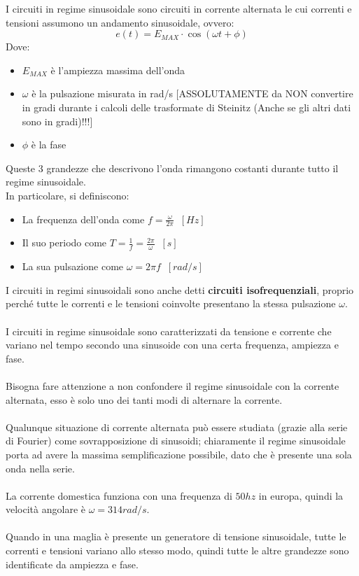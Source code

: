 \documentclass[../main.tex]{subfiles}
\begin{document}
	I circuiti in regime sinusoidale sono circuiti in corrente alternata le cui correnti e tensioni assumono un andamento sinusoidale, ovvero:
	\[e(t) = E_{MAX} \cdot \cos (\omega t + \phi)\]
	Dove:
	\begin{itemize}
		\item $E_{MAX}$ è l'ampiezza massima dell'onda
		\item $\omega$ è la pulsazione misurata in rad/s [ASSOLUTAMENTE da NON convertire in gradi durante i calcoli delle trasformate di Steinitz (Anche se gli altri dati sono in gradi)!!!]
		\item $\phi$ è la fase
	\end{itemize}
	Queste 3 grandezze che descrivono l’onda rimangono costanti durante tutto il regime sinusoidale.\\
	In particolare, si definiscono:
	\begin{itemize}
		\item La frequenza dell’onda come $f = \frac{\omega}{2 \pi} \;\; [Hz]$
		\item Il suo periodo come $T = \frac{1}{f} = \frac{2 \pi}{\omega} \;\; [s]$
		\item La sua pulsazione come $\omega = 2 \pi f \;\; [rad/s]$
	\end{itemize}
	I circuiti in regimi sinusoidali sono anche detti \textbf{circuiti isofrequenziali}, proprio perché tutte le correnti e le tensioni coinvolte presentano la stessa pulsazione $\omega$.\\\\
	I circuiti in regime sinusoidale sono caratterizzati da tensione e corrente che variano nel tempo secondo una sinusoide con una certa frequenza, ampiezza e fase.\\\\
	Bisogna fare attenzione a non confondere il regime sinusoidale con la corrente alternata, esso è solo uno dei tanti modi di alternare la corrente.\\\\
	Qualunque situazione di corrente alternata può essere studiata (grazie alla serie di Fourier) come sovrapposizione di sinusoidi; chiaramente il regime sinusoidale porta ad avere la massima semplificazione possibile, dato che è presente una sola onda nella serie.\\\\
	La corrente domestica funziona con una frequenza di $50hz$ in europa, quindi la velocità angolare è $\omega = 314 rad/s$.\\\\
	Quando in una maglia è presente un generatore di tensione sinusoidale, tutte le correnti e tensioni variano allo stesso modo, quindi tutte le altre grandezze sono identificate da ampiezza e fase.
\end{document}
